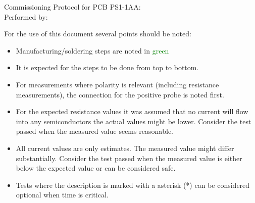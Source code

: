 \begin{Form}[]
\fontsize{25pt}{20}\selectfont Commissioning Protocol for PCB PS1-1AA: \TextField[name=Title, bordercolor = black, borderstyle = U]{}\\

Performed by: \TextField[name=Name, bordercolor = black, borderstyle = U]{}
\end{Form}

\vspace{6cm}

For the use of this document several points should be noted:

\begin{itemize}
\item Manufacturing/soldering steps are noted in \textcolor{green}{green}
\item It is expected for the steps to be done from top to bottom.
\item For measurements where polarity is relevant (including resistance measurements), the connection for the positive probe is noted first.
\item For the expected resistance values it was assumed that no current will flow into any semiconductors the actual values might be lower. Consider the test passed when the measured value seems reasonable.
\item All current values are only estimates. The measured value might differ substantially. Consider the test passed when the measured value is either below the expected value or can be considered safe.
\item Tests where the description is marked with a asterisk (*) can be considered optional when time is critical.

\end{itemize}
